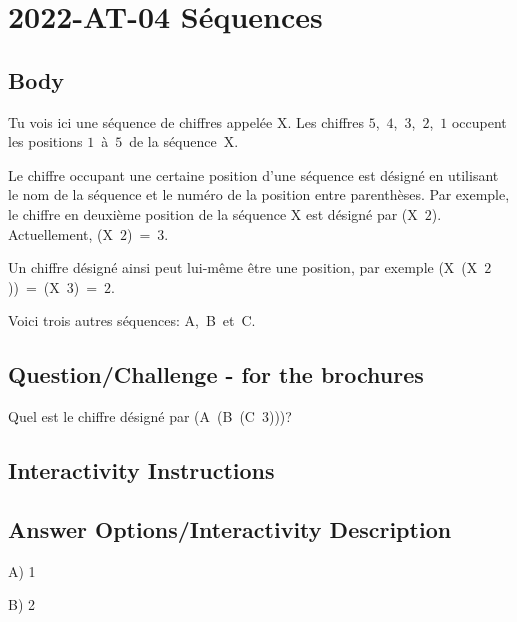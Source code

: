 \documentclass[a4paper,11pt]{report}
\newcommand{\taskGraphicsFolder}{..}
\begin{document}
\section*{\centering{} 2022-AT-04 Séquences}


\subsection*{Body}

Tu vois ici une séquence de chiffres appelée X. Les chiffres $5$,~$4$,~$3$,~$2$,~$1$ occupent les positions $1$~à~$5$~de la séquence~X.

{\centering%
\par}

Le chiffre occupant une certaine position d’une séquence est désigné en utilisant le nom de la séquence et le numéro de la position entre parenthèses. Par exemple, le chiffre en deuxième position de la séquence X est désigné par (X~$2$). Actuellement, (X~$2$)~=~$3$.

Un chiffre désigné ainsi peut lui-même être une position, par exemple (X~(X~$2$))~=~(X~$3$)~=~$2$.

Voici trois autres séquences: A,~B~et~C.

{\centering%
\par}

{\em


\subsection*{Question/Challenge - for the brochures}

Quel est le chiffre désigné par (A~(B~(C~3)))?

}


\subsection*{Interactivity Instructions}



\begingroup
\renewcommand{\arraystretch}{1.5}
\subsection*{Answer Options/Interactivity Description}

A) 1

B) 2
\end{document}
